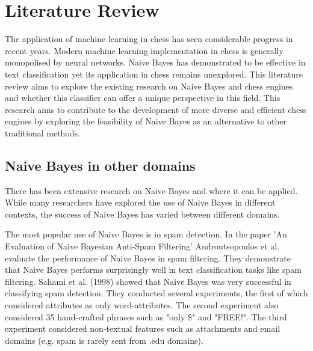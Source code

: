 \chapter{Literature Review}

The application of machine learning in chess has seen considerable progress in recent years. Modern machine learning implementation in chess is generally monopolised by neural networks. Naive Bayes has demonstrated to be effective in text classification yet its application in chess remains unexplored. This literature review aims to explore the existing research on Naive Bayes and chess engines and whether this classifier can offer a unique perspective in this field. This research aims to contribute to the development of more diverse and efficient chess engines by exploring the feasibility of Naive Bayes as an alternative to other traditional methods.


\section{Naive Bayes in other domains}
There has been extensive research on Naive Bayes and where it can be applied. While many researchers have explored the use of Naive Bayes in different contexts, the success of Naive Bayes has varied between different domains.

The most popular use of Naive Bayes is in spam detection. In the paper 'An Evaluation of Naive Bayesian Anti-Spam Filtering'  Androutsopoulos et al. \cite{androutsopoulosEvaluationNaiveBayesian2000} evaluate the performance of Naive Bayes in spam filtering. They demonstrate that Naive Bayes performs surprisingly well in text classification tasks like spam filtering. Sahami et al. (1998) \cite{sahamiBayesianApproachFiltering} showed that Naive Bayes was very successful in classifying spam detection. They conducted several experiments, the first of which considered attributes as only word-attributes. The second experiment also considered 35 hand-crafted phrases such as "only \$" and "FREE!". The third experiment considered non-textual features such as attachments and email domains (e.g. spam is rarely sent from .edu domains). 



